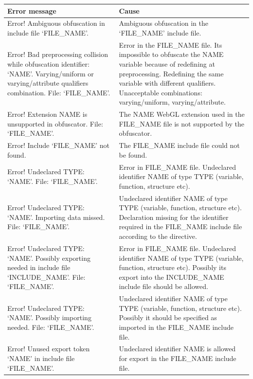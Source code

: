 \documentclass[a4paper,12pt,oneside]{sphinxmanual}
\begin{document}
\begin{tabulary}{\linewidth}{|L|L|}
\hline
\textsf{\relax 
Error message
} & \textsf{\relax 
Cause
}\\
\hline
Error! Ambiguous obfuscation in
include file `FILE\_NAME'.
 & 
Ambiguous obfuscation in the `FILE\_NAME' include file.
\\

Error! Bad preprocessing collision
while obfuscation identifier:
`NAME'. Varying/uniform or
varying/attribute qualifiers
combination. File: `FILE\_NAME'.
 & 
Error in the FILE\_NAME file. Its impossible to obfuscate the NAME variable because of redefining at preprocessing. Redefining the same variable with different qualifiers. Unacceptable combinations: varying/uniform, varying/attribute.
\\

Error! Extension NAME is
unsupported in obfuscator. File:
`FILE\_NAME'.
 & 
The NAME WebGL extension used in the FILE\_NAME file is not supported by the obfuscator.
\\

Error! Include `FILE\_NAME' not
found.
 & 
The FILE\_NAME include file could not be found.
\\

Error! Undeclared TYPE: `NAME'.
File: `FILE\_NAME'.
 & 
Error in FILE\_NAME file. Undeclared identifier NAME of type TYPE (variable, function, structure etc).
\\

Error! Undeclared TYPE: `NAME'.
Importing data missed. File:
`FILE\_NAME'.
 & 
Undeclared identifier NAME of type TYPE (variable, function, structure etc). Declaration missing for the identifier required in the FILE\_NAME include file according to the  directive.
\\

Error! Undeclared TYPE: `NAME'.
Possibly exporting needed in
include file `INCLUDE\_NAME'. File:
`FILE\_NAME'.
 & 
Error in FILE\_NAME file. Undeclared identifier NAME of type TYPE (variable, function, structure etc). Possibly its export into the INCLUDE\_NAME include file should be allowed.
\\

Error! Undeclared TYPE: `NAME'.
Possibly importing needed. File:
`FILE\_NAME'.
 & 
Undeclared identifier NAME of type TYPE (variable, function, structure etc). Possibly it should be specified as imported in the FILE\_NAME include file.
\\

Error! Unused export token `NAME'
in include file `FILE\_NAME'.
 & 
Undeclared identifier NAME is allowed for export in the FILE\_NAME include file.
\\
\hline\end{tabulary}
\end{document}
